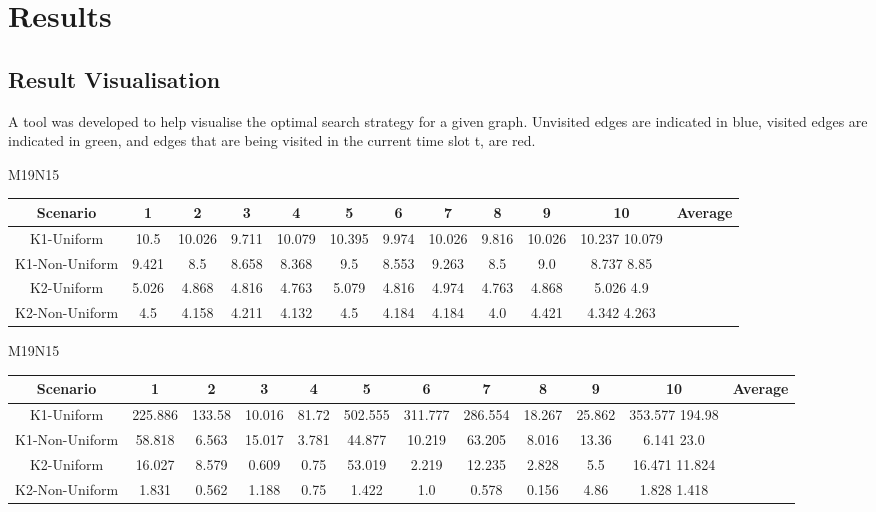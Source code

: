 \documentclass{article}
\begin{document}
\section{Results}
\subsection{Result Visualisation}
A tool was developed to help visualise the optimal search strategy for a given graph. Unvisited edges are indicated in blue, visited edges are indicated in green, and edges that are being visited in the current time slot t, are red.
\begin{table}
M19N15\\
\begin{tabular}{ |c|c|c|c|c|c|c|c|c|c|c|c|  }
\hline
Scenario & 1 & 2 & 3 & 4 & 5 & 6 & 7 & 8 & 9 & 10 & Average\\
\hline
K1-Uniform & 10.5 & 10.026 & 9.711 & 10.079 & 10.395 & 9.974 & 10.026 & 9.816 & 10.026 & 10.237 10.079\\ \hline
K1-Non-Uniform & 9.421 & 8.5 & 8.658 & 8.368 & 9.5 & 8.553 & 9.263 & 8.5 & 9.0 & 8.737 8.85\\ \hline
K2-Uniform & 5.026 & 4.868 & 4.816 & 4.763 & 5.079 & 4.816 & 4.974 & 4.763 & 4.868 & 5.026 4.9\\ \hline
K2-Non-Uniform & 4.5 & 4.158 & 4.211 & 4.132 & 4.5 & 4.184 & 4.184 & 4.0 & 4.421 & 4.342 4.263\\ \hline
\end{tabular}
\end{table}

\begin{table}
M19N15\\
\begin{tabular}{ |c|c|c|c|c|c|c|c|c|c|c|c| }
\hline
Scenario & 1 & 2 & 3 & 4 & 5 & 6 & 7 & 8 & 9 & 10 & Average\\
\hline
K1-Uniform & 225.886 & 133.58 & 10.016 & 81.72 & 502.555 & 311.777 & 286.554 & 18.267 & 25.862 & 353.577 194.98\\ \hline
K1-Non-Uniform & 58.818 & 6.563 & 15.017 & 3.781 & 44.877 & 10.219 & 63.205 & 8.016 & 13.36 & 6.141 23.0\\ \hline
K2-Uniform & 16.027 & 8.579 & 0.609 & 0.75 & 53.019 & 2.219 & 12.235 & 2.828 & 5.5 & 16.471 11.824\\ \hline
K2-Non-Uniform & 1.831 & 0.562 & 1.188 & 0.75 & 1.422 & 1.0 & 0.578 & 0.156 & 4.86 & 1.828 1.418\\ \hline
\end{tabular}
\end{table}
\end{document}
